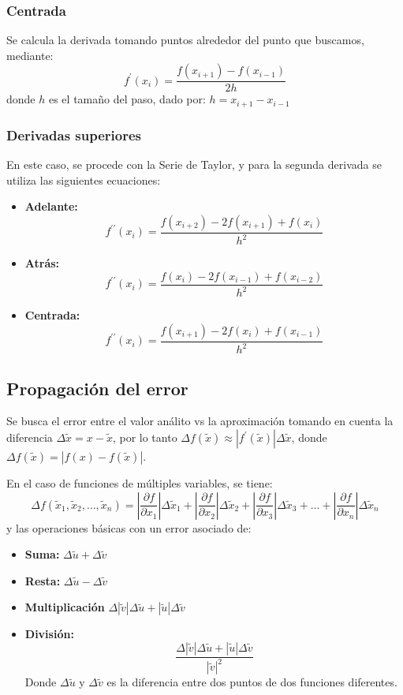\documentclass[letterpaper, 12pt, twoside]{article}
\begin{document}
	\subsubsection{Centrada}
	Se calcula la derivada tomando puntos alrededor del punto que buscamos, mediante: $$f^{\prime}(x_i) = \frac{f(x_{i+1})-f(x_{i-1})}{2h}$$ donde $h$ es el tamaño del paso, dado por: $h = x_{i+1} -x_{i-1}$
	\subsubsection{Derivadas superiores}
	En este caso, se procede con la Serie de Taylor, y para la segunda derivada se utiliza las siguientes ecuaciones:
	\begin{itemize}
		\item \textbf{Adelante:}  $$f^{\prime\prime}(x_i)=\frac{f(x_{i+2})-2f(x_{i+1})+f(x_{i})}{h^2}$$
		\item \textbf{Atrás:} 	  $$f^{\prime\prime}(x_i)=\frac{f(x_{i})-2f(x_{i-1})+f(x_{i-2})}{h^2}$$
		\item \textbf{Centrada:}  $$f^{\prime\prime}(x_i)=\frac{f(x_{i+1})-2f(x_i)+f(x_{i-1})}{h^2}$$
	\end{itemize}
	\subsection{Propagación del error}
	Se busca el error entre el valor análito vs la aproximación tomando en cuenta la diferencia $\Delta \tilde{x} = x - \tilde{x}$, por lo tanto $\Delta f(\tilde{x}) \approx |f^{\prime}(\tilde{x})|\Delta \tilde{x}$, donde $\Delta f(\tilde{x}) = |f(x) - f(\tilde{x})|$.
	\bigskip
	
	En el caso de funciones de múltiples variables, se tiene: $$ \Delta f(\tilde{x}_1,\tilde{x}_2,\dots,\tilde{x}_n) = \left|\frac{\partial f}{\partial x_1}\right|\Delta\tilde{x}_1 + \left|\frac{\partial f}{\partial x_2}\right|\Delta\tilde{x}_2 + \left|\frac{\partial f}{\partial x_3}\right|\Delta\tilde{x}_3 + \dots + \left|\frac{\partial f}{\partial x_n}\right|\Delta\tilde{x}_n $$ y las operaciones básicas con un error asociado de:
	\begin{itemize}
		\item \textbf{Suma:} $\Delta \tilde{u}+ \Delta \tilde{v}$
		\item \textbf{Resta:} $\Delta \tilde{u} - \Delta \tilde{v}$
		\item \textbf{Multiplicación} $\Delta |\tilde{v}|\Delta\tilde{u} + |\tilde{u}|\Delta\tilde{v}$
		\item \textbf{División:} $$\frac{\Delta |\tilde{v}|\Delta\tilde{u} + |\tilde{u}|\Delta\tilde{v}}{|\tilde{v}|^2}$$
		Donde $\Delta\tilde{u}$ y $\Delta\tilde{v}$ es la diferencia entre dos puntos de dos funciones diferentes.
	\end{itemize}
\end{document}
